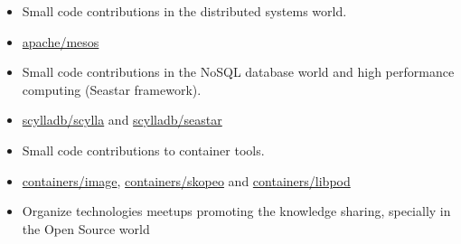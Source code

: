 \documentclass[10pt,a4paper]{altacv}
\begin{document}

\begin{itemize}
\item Small code contributions in the distributed systems world.
\item \href{https://github.com/apache/mesos/commits/master?author=jvanz}{apache/mesos}
\end{itemize}

\begin{itemize}
\item Small code contributions in the NoSQL database world and high performance computing (Seastar framework).
\item \href{https://github.com/scylladb/scylla/commits/master?author=jvanz}{scylladb/scylla} and \href{https://github.com/scylladb/seastar/commits/master?author=jvanz}{scylladb/seastar}
\end{itemize}

\begin{itemize}
\item Small code contributions to container tools.
\item \href{https://github.com/containers/image/commits?author=jvanz}{containers/image},  \href{https://github.com/containers/skopeo/commits?author=jvanz}{containers/skopeo} and \href{https://github.com/containers/libpod/commits?author=jvanz}{containers/libpod}
\end{itemize}

\begin{itemize}
\item Organize technologies meetups promoting the knowledge sharing, specially in the Open Source world
\end{itemize}

\clearpage
\end{document}

